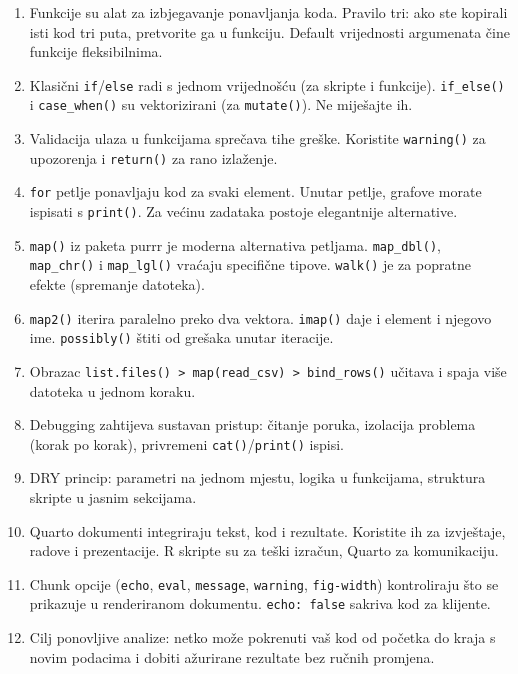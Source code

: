 \documentclass[
  croatian,
  letterpaper,
  DIV=11,
  numbers=noendperiod]{scrartcl}
\begin{document}
\begin{tcolorbox}[enhanced jigsaw, coltitle=black, arc=.35mm, colframe=quarto-callout-important-color-frame, left=2mm, bottomrule=.15mm, toprule=.15mm, leftrule=.75mm, bottomtitle=1mm, colback=white, title=\textcolor{quarto-callout-important-color}{\faExclamation}\hspace{0.5em}{Ključni zaključci}, opacityback=0, colbacktitle=quarto-callout-important-color!10!white, toptitle=1mm, titlerule=0mm, opacitybacktitle=0.6, breakable, rightrule=.15mm]

\begin{enumerate}
\def\labelenumi{\arabic{enumi}.}
\item
  Funkcije su alat za izbjegavanje ponavljanja koda. Pravilo tri: ako
  ste kopirali isti kod tri puta, pretvorite ga u funkciju. Default
  vrijednosti argumenata čine funkcije fleksibilnima.
\item
  Klasični \texttt{if}/\texttt{else} radi s jednom vrijednošću (za
  skripte i funkcije). \texttt{if\_else()} i \texttt{case\_when()} su
  vektorizirani (za \texttt{mutate()}). Ne miješajte ih.
\item
  Validacija ulaza u funkcijama sprečava tihe greške. Koristite
  \texttt{warning()} za upozorenja i \texttt{return()} za rano
  izlaženje.
\item
  \texttt{for} petlje ponavljaju kod za svaki element. Unutar petlje,
  grafove morate ispisati s \texttt{print()}. Za većinu zadataka postoje
  elegantnije alternative.
\item
  \texttt{map()} iz paketa purrr je moderna alternativa petljama.
  \texttt{map\_dbl()}, \texttt{map\_chr()} i \texttt{map\_lgl()} vraćaju
  specifične tipove. \texttt{walk()} je za popratne efekte (spremanje
  datoteka).
\item
  \texttt{map2()} iterira paralelno preko dva vektora. \texttt{imap()}
  daje i element i njegovo ime. \texttt{possibly()} štiti od grešaka
  unutar iteracije.
\item
  Obrazac
  \texttt{list.files()\ \textbar{}\textgreater{}\ map(read\_csv)\ \textbar{}\textgreater{}\ bind\_rows()}
  učitava i spaja više datoteka u jednom koraku.
\item
  Debugging zahtijeva sustavan pristup: čitanje poruka, izolacija
  problema (korak po korak), privremeni \texttt{cat()}/\texttt{print()}
  ispisi.
\item
  DRY princip: parametri na jednom mjestu, logika u funkcijama,
  struktura skripte u jasnim sekcijama.
\item
  Quarto dokumenti integriraju tekst, kod i rezultate. Koristite ih za
  izvještaje, radove i prezentacije. R skripte su za teški izračun,
  Quarto za komunikaciju.
\item
  Chunk opcije (\texttt{echo}, \texttt{eval}, \texttt{message},
  \texttt{warning}, \texttt{fig-width}) kontroliraju što se prikazuje u
  renderiranom dokumentu. \texttt{echo:\ false} sakriva kod za klijente.
\item
  Cilj ponovljive analize: netko može pokrenuti vaš kod od početka do
  kraja s novim podacima i dobiti ažurirane rezultate bez ručnih
  promjena.
\end{enumerate}


\end{tcolorbox}
\end{document}
